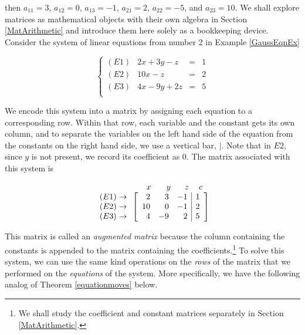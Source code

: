 \documentclass{ximera}
\begin{document}
then $a_{11} = 3$, $a_{12} = 0$, $a_{13} = -1$, $a_{21} = 2$, $a_{22} = -5$, and $a_{23} = 10$.  We shall explore matrices as mathematical objects with their own algebra in Section \ref{MatArithmetic} and introduce them here solely as a bookkeeping device.  Consider the system of linear equations  from number 2 in Example \ref{GaussEqnEx}

\[\left\{ \begin{array}{lrcr} (E1) & 2x+3y-z & = & 1 \\ 
(E2) & 10x-z & = & 2 \\ 
(E3) & 4x-9y+2z & = & 5 \\ \end{array} \right.\]  

We encode this system into a matrix by assigning each equation to a corresponding row.  Within that row, each variable and the constant gets its own column, and to separate the variables on the left hand side of the equation from the constants on the right hand side, we use a vertical bar, $|$.  Note that in $E2$, since $y$ is not present, we record its coefficient as $0$. The matrix associated with this system is 

\[ \begin{array}{c} \begin{array}{rrrrrrr} & & & \hspace{.33in} x & \hspace{.12in} y & \hspace{.1in} z & \hspace{.03in} c \\ \end{array} \\  \begin{array}{r} (E1) \rightarrow \\ (E2) \rightarrow \\ (E3) \rightarrow \end{array}  \left[ \begin{array}{rrr|r} 2 & 3 & -1 & 1\\ 10 & 0 & -1 & 2 \\ 4 & -9 & 2 & 5 \end{array} \right] \end{array} \]  

This matrix is called an \textit{augmented matrix} because the column containing the constants is appended to the matrix containing the coefficients.\footnote{We shall study the coefficient and constant matrices separately in Section \ref{MatArithmetic}.}  To solve this system, we can use the same kind operations on the \textit{rows} of the matrix that we performed on the \textit{equations} of the system. More specifically, we have the following analog of Theorem \ref{equationmoves} below.
\end{document}
